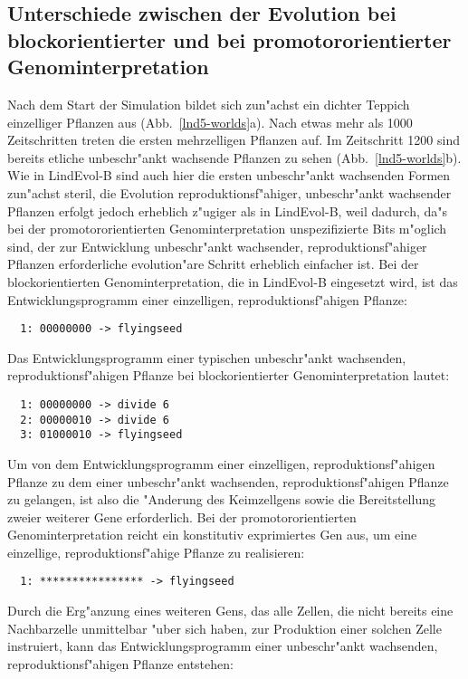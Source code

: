 \subsection{Unterschiede zwischen der Evolution bei blockorientierter und bei promotororientierter Genominterpretation}
\label{lnd5-blockprodiffs}

Nach dem Start der Simulation bildet sich zun"achst ein dichter Teppich einzelliger Pflanzen aus (Abb.\ \ref{lnd5-worlds}a).
Nach etwas mehr als 1000 Zeitschritten treten die ersten mehrzelligen Pflanzen auf. Im Zeitschritt 1200 sind bereits
etliche unbeschr"ankt wachsende Pflanzen zu sehen (Abb.\ \ref{lnd5-worlds}b). Wie in LindEvol-B sind auch hier die ersten
unbeschr"ankt wachsenden Formen zun"achst steril, die Evolution reproduktionsf"ahiger, unbeschr"ankt wachsender Pflanzen
erfolgt jedoch erheblich z"ugiger als in LindEvol-B, weil dadurch, da"s bei der promotororientierten Genominterpretation
unspezifizierte Bits m"oglich sind, der zur Entwicklung unbeschr"ankt wachsender, reproduktionsf"ahiger Pflanzen erforderliche
evolution"are Schritt erheblich einfacher ist. Bei der blockorientierten Genominterpretation, die in LindEvol-B eingesetzt
wird, ist das Entwicklungsprogramm einer einzelligen, reproduktionsf"ahigen Pflanze:

\begin{verbatim}
  1: 00000000 -> flyingseed
\end{verbatim}

Das Entwicklungsprogramm einer typischen unbeschr"ankt wachsenden, reproduktionsf"ahigen Pflanze bei blockorientierter
Genominterpretation lautet:

\begin{verbatim}
  1: 00000000 -> divide 6
  2: 00000010 -> divide 6
  3: 01000010 -> flyingseed
\end{verbatim}

Um von dem Entwicklungsprogramm einer einzelligen, reproduktionsf"ahigen Pflanze zu dem einer unbeschr"ankt wachsenden,
reproduktionsf"ahigen Pflanze zu gelangen, ist also die "Anderung des Keimzellgens sowie die Bereitstellung zweier weiterer
Gene erforderlich.
Bei der promotororientierten Genominterpretation reicht ein konstitutiv exprimiertes Gen aus, um eine einzellige,
reproduktionsf"ahige Pflanze zu realisieren:

\begin{verbatim}
  1: **************** -> flyingseed
\end{verbatim}

Durch die Erg"anzung eines weiteren Gens, das alle Zellen, die nicht bereits eine Nachbarzelle unmittelbar "uber sich
haben, zur Produktion einer solchen Zelle instruiert, kann das Entwicklungsprogramm einer unbeschr"ankt wachsenden,
reproduktionsf"ahigen Pflanze entstehen:

